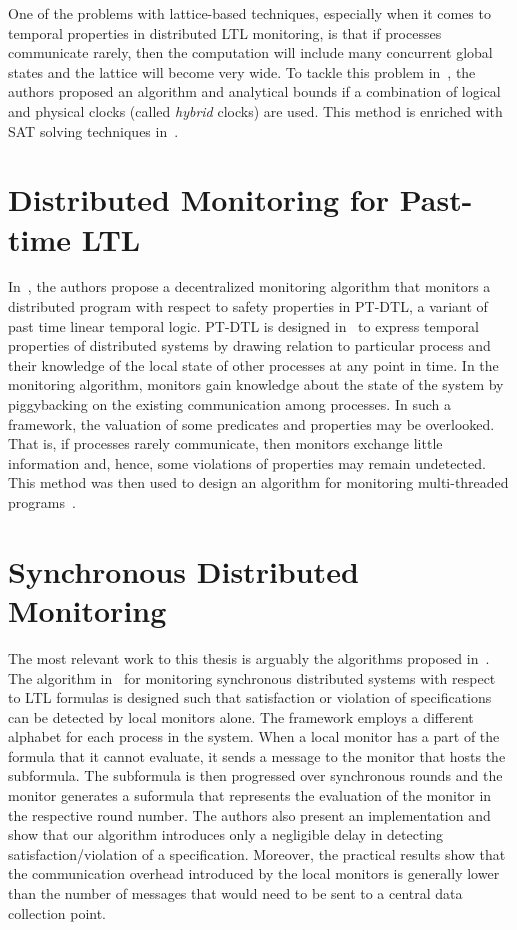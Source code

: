 One of the problems with lattice-based techniques, especially when it comes to 
temporal properties in distributed LTL monitoring, is that if processes 
communicate rarely, then the computation will include many 
concurrent global states and the lattice will become very wide. To tackle this 
problem in~\cite{ynvkd16}, the authors proposed an algorithm and analytical 
bounds if a combination of logical and physical clocks (called {\em hybrid} 
clocks) are used. This method is enriched with SAT solving techniques 
in~\cite{vyktd17}.

\section{Distributed Monitoring for Past-time LTL}

In~\cite{svar04}, the authors propose a decentralized monitoring algorithm
that 
monitors a distributed program with respect to safety properties in PT-DTL, a 
variant of past
time linear temporal logic. PT-DTL is designed in~\cite{svar04} 
to express temporal properties of distributed systems by drawing relation to 
particular process and their knowledge of the local state of other processes 
at any point in time. In the monitoring algorithm, monitors gain knowledge 
about the state of the system by piggybacking on the existing communication 
among processes. In such a framework, the valuation of some predicates and 
properties may be overlooked. That is, if processes rarely communicate, then 
monitors exchange little information and, hence, some violations of properties 
may remain undetected. This method was then used to design an algorithm for 
monitoring multi-threaded programs~\cite{svar06}.

\section{Synchronous Distributed Monitoring}

The most relevant work to this thesis is arguably the algorithms proposed 
in~\cite{bf16,cf16}. The algorithm in~\cite{bf16} for monitoring synchronous 
distributed systems with respect to LTL formulas is designed such that 
satisfaction or violation of specifications can be detected by local monitors 
alone. The framework employs a different alphabet for each process in the 
system. When a local monitor has a part of the formula that it cannot evaluate, 
it sends a message to the monitor that hosts the subformula. The subformula is 
then progressed over synchronous rounds and the monitor generates a 
suformula that represents the evaluation of the monitor in the respective round 
number. The authors also present an implementation and show that our algorithm 
introduces only a negligible delay in detecting satisfaction/violation of a 
specification. Moreover, the practical results show that the communication 
overhead introduced by the local monitors is generally  lower than the number of 
messages that would need to be sent to a central data collection point. 

